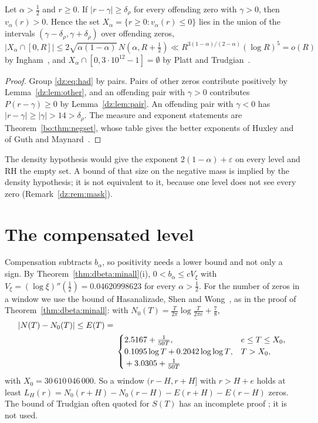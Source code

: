 \begin{theorem}[localisation]\label{dz:thm:loc}
Let $\alpha>\frac12$ and $r\ge0$. If $|r-\gamma|\ge\delta_\rho$ for every offending zero with $\gamma>0$, then $v_\alpha(r)>0$. Hence the set $X_\alpha=\{r\ge0:v_\alpha(r)\le0\}$ lies in the union of the intervals $(\gamma-\delta_\rho,\gamma+\delta_\rho)$ over offending zeros, $|X_\alpha\cap[0,R]|\le2\sqrt{\alpha(1-\alpha)}\,N(\alpha,R+\frac12)\ll R^{3(1-\alpha)/(2-\alpha)}(\log R)^5=o(R)$ by Ingham~\cite{Ingham40}, and $X_\alpha\cap[0,3\cdot10^{12}-1]=\emptyset$ by Platt and Trudgian~\cite{PT21}.
\end{theorem}
\begin{proof}
Group \eqref{dz:eq:had} by pairs. Pairs of other zeros contribute positively by Lemma~\ref{dz:lem:other}, and an offending pair with $\gamma>0$ contributes $P(r-\gamma)\ge0$ by Lemma~\ref{dz:lem:pair}. An offending pair with $\gamma<0$ has $|r-\gamma|\ge|\gamma|>14>\delta_\rho$. The measure and exponent statements are Theorem~\ref{bo:thm:negset}, whose table gives the better exponents of Huxley and of Guth and Maynard~\cite{GM26,Huxley72}.
\end{proof}
The density hypothesis would give the exponent $2(1-\alpha)+\varepsilon$ on every level and RH the empty set. A bound of that size on the negative mass is implied by the density hypothesis; it is not equivalent to it, because one level does not see every zero (Remark~\ref{dz:rem:mask}).

\section{The compensated level}\label{dz:sec:comp}
Compensation subtracts $b_\alpha$, so positivity needs a lower bound and not only a sign. By Theorem~\ref{thm:dbeta:minall}(i), $0<b_\alpha\le cV_\xi$ with $V_\xi=(\log\xi)''(\frac12)=0.04620998623$ for every $\alpha>\frac12$. For the number of zeros in a window we use the bound of Hasanalizade, Shen and Wong~\cite{HSW22}, as in the proof of Theorem~\ref{thm:dbeta:minall}: with $N_0(T)=\frac T{2\pi}\log\frac T{2\pi e}+\frac78$,
\begin{equation}\label{dz:eq:count}
\begin{split}|N(T)-N_0(T)|\le E(T)={}&\\&\begin{cases}2.5167+\frac1{50T},&e\le T\le X_0,\\\begin{array}[t]{@{}l@{}}0.1095\log T+0.2042\log\log T\\{}+3.0305+\frac1{50T}\end{array},&T>X_0,\end{cases}\end{split}
\end{equation}
with $X_0=30\,610\,046\,000$. So a window $(r-H,r+H]$ with $r>H+e$ holds at least $L_H(r)=N_0(r+H)-N_0(r-H)-E(r+H)-E(r-H)$ zeros. The bound of Trudgian often quoted for $S(T)$ has an incomplete proof \cite{HSW22}; it is not used.

